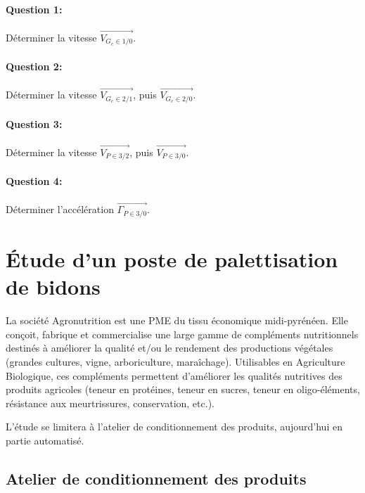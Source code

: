 \paragraph{Question 1:}

Déterminer la vitesse $\overrightarrow{V_{G_c \in 1/0}}$.

\paragraph{Question 2:}

Déterminer la vitesse $\overrightarrow{V_{G_c \in 2/1}}$, puis $\overrightarrow{V_{G_c \in 2/0}}$.

\paragraph{Question 3:}

Déterminer la vitesse $\overrightarrow{V_{P \in 3/2}}$, puis $\overrightarrow{V_{P \in 3/0}}$.

\paragraph{Question 4:}

Déterminer l'accélération $\overrightarrow{\Gamma_{P \in 3/0}}$.

\newpage

\section{Étude d'un poste de palettisation de bidons}

La société Agronutrition est une PME du tissu économique midi-pyrénéen. Elle conçoit, fabrique et commercialise une large gamme de compléments nutritionnels destinés à améliorer la qualité et/ou le rendement des productions végétales (grandes cultures, vigne, arboriculture, maraîchage). Utilisables en Agriculture Biologique, ces compléments permettent d'améliorer les qualités nutritives des produits agricoles (teneur en protéines, teneur en sucres, teneur en oligo-éléments, résistance aux meurtrissures, conservation, etc.).

L'étude se limitera à l'atelier de conditionnement des produits, aujourd'hui en partie automatisé.

\subsection{Atelier de conditionnement des produits}

